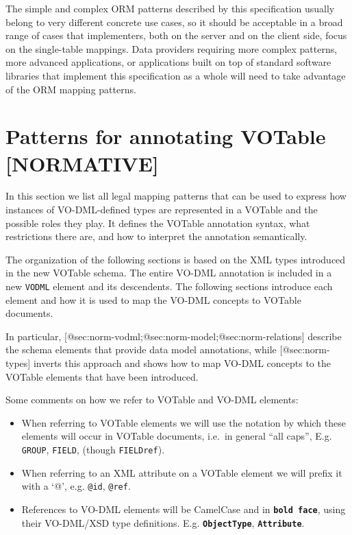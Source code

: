 \documentclass[11pt,a4paper]{ivoa}
\begin{document}
The simple and complex ORM patterns described by this specification
usually belong to very different concrete use cases, so it should be
acceptable in a broad range of cases that implementers, both on the
server and on the client side, focus on the single-table mappings. Data
providers requiring more complex patterns, more advanced applications,
or applications built on top of standard software libraries that
implement this specification as a whole will need to take advantage of
the ORM mapping patterns.

\section{Patterns for annotating VOTable
{[}NORMATIVE{]}}\label{sec:normative}

In this section we list all legal mapping patterns that can be used to
express how instances of VO-DML-defined types are represented in a
VOTable and the possible roles they play. It defines the VOTable
annotation syntax, what restrictions there are, and how to interpret the
annotation semantically.

The organization of the following sections is based on the XML types
introduced in the new VOTable schema. The entire VO-DML annotation is
included in a new \texttt{VODML} element and its descendents. The
following sections introduce each element and how it is used to map the
VO-DML concepts to VOTable documents.

In particular, {[}@sec:norm-vodml;@sec:norm-model;@sec:norm-relations{]}
describe the schema elements that provide data model annotations, while
{[}@sec:norm-types{]} inverts this approach and shows how to map VO-DML
concepts to the VOTable elements that have been introduced.

Some comments on how we refer to VOTable and VO-DML elements:

\begin{itemize}
\item
  When referring to VOTable elements we will use the notation by which
  these elements will occur in VOTable documents, i.e.~in general ``all
  caps'', E.g. \texttt{GROUP}, \texttt{FIELD}, (though
  \texttt{FIELDref}).
\item
  When referring to an XML attribute on a VOTable element we will prefix
  it with a `@', e.g. \texttt{@id}, \texttt{@ref}.
\item
  References to VO-DML elements will be CamelCase and in
  \textbf{\texttt{bold face}}, using their VO-DML/XSD type definitions.
  E.g. \textbf{\texttt{ObjectType}}, \textbf{\texttt{Attribute}}.
\end{itemize}
\end{document}
